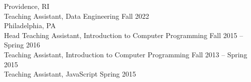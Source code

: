 \documentclass{resume} %
\begin{document}
\hspace*{1mm}{\bf Brown University } \hfill Providence, RI \\
\hspace*{1mm}Teaching Assistant, Data Engineering \hfill Fall 2022 \\

\hspace*{1mm}{\bf University of Pennsylvania } \hfill Philadelphia, PA \\
\hspace*{1mm}Head Teaching Assistant, Introduction to Computer Programming \hfill Fall 2015 -- Spring 2016\\
\hspace*{1mm}Teaching Assistant, Introduction to Computer Programming \hfill Fall 2013 -- Spring 2015\\
\hspace*{1mm}Teaching Assistant, JavaScript \hfill Spring 2015 \\

\end{document}
